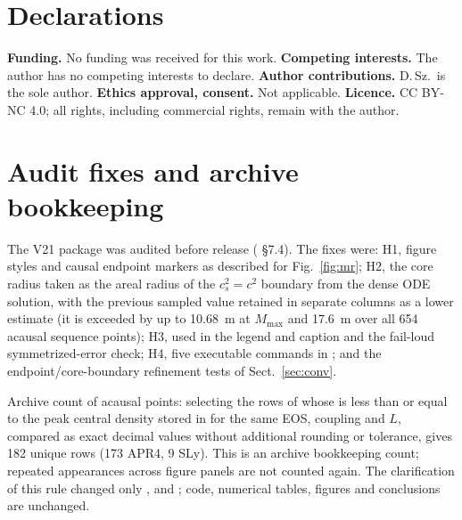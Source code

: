 \documentclass[11pt,a4paper]{article}
\begin{document}
\section*{Declarations}
\textbf{Funding.} No funding was received for this work.
\textbf{Competing interests.} The author has no competing interests to declare.
\textbf{Author contributions.} D.\,Sz.\ is the sole author.
\textbf{Ethics approval, consent.} Not applicable.
\textbf{Licence.} CC BY-NC 4.0; all rights, including commercial rights, remain with the author.

\appendix
\section{Audit fixes and archive bookkeeping}
The V21 package was audited before release ( \S7.4). The fixes were:
H1, figure styles and causal endpoint markers as described for Fig.~\ref{fig:mr};
H2, the core radius taken as the areal radius of the $c_s^2=c^2$ boundary from the dense ODE solution, with the
previous sampled value retained in separate columns as a lower estimate (it is exceeded by up to 10.68~m at
$M_{\max}$ and 17.6~m over all 654 acausal sequence points);
H3,  used in the legend and caption and the fail-loud symmetrized-error check;
H4, five executable commands in ; and the endpoint/core-boundary refinement tests of
Sect.~\ref{sec:conv}.

Archive count of acausal points: selecting the  rows of  whose
 is less than or equal to the peak central density stored in 
for the same EOS, coupling and $L$, compared as exact decimal values without additional rounding or tolerance,
gives 182 unique rows (173 APR4, 9 SLy). This is an archive bookkeeping count; repeated appearances across figure
panels are not counted again. The clarification of this rule changed only ,
 and ; code, numerical tables, figures and conclusions are unchanged.
\end{document}
